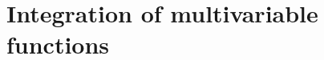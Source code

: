 \chapter[Integration of multivariable functions]{Integration of multivariable \\ functions}
\thispagestyle{noheaders}

